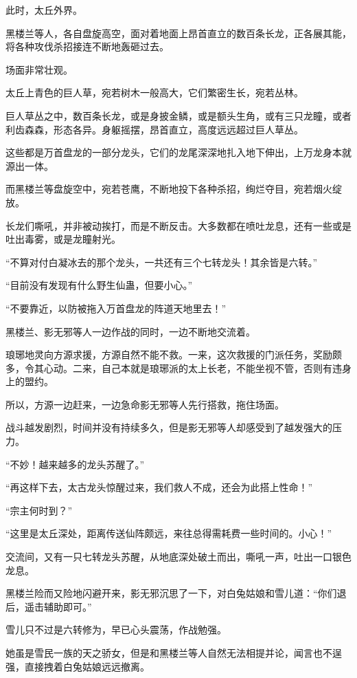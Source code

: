 \begin{this_body}
此时，太丘外界。

黑楼兰等人，各自盘旋高空，面对着地面上昂首直立的数百条长龙，正各展其能，将各种攻伐杀招接连不断地轰砸过去。

场面非常壮观。

太丘上青色的巨人草，宛若树木一般高大，它们繁密生长，宛若丛林。

巨人草丛之中，数百条长龙，或是身披金鳞，或是额头生角，或有三只龙瞳，或者利齿森森，形态各异。身躯摇摆，昂首直立，高度远远超过巨人草丛。

这些都是万首盘龙的一部分龙头，它们的龙尾深深地扎入地下伸出，上万龙身本就源出一体。

而黑楼兰等盘旋空中，宛若苍鹰，不断地投下各种杀招，绚烂夺目，宛若烟火绽放。

长龙们嘶吼，并非被动挨打，而是不断反击。大多数都在喷吐龙息，还有一些或是吐出毒雾，或是龙瞳射光。

“不算对付白凝冰去的那个龙头，一共还有三个七转龙头！其余皆是六转。”

“目前没有发现有什么野生仙蛊，但要小心。”

“不要靠近，以防被拖入万首盘龙的阵道天地里去！”

黑楼兰、影无邪等人一边作战的同时，一边不断地交流着。

琅琊地灵向方源求援，方源自然不能不救。一来，这次救援的门派任务，奖励颇多，令其心动。二来，自己本就是琅琊派的太上长老，不能坐视不管，否则有违身上的盟约。

所以，方源一边赶来，一边急命影无邪等人先行搭救，拖住场面。

战斗越发剧烈，时间并没有持续多久，但是影无邪等人却感受到了越发强大的压力。

“不妙！越来越多的龙头苏醒了。”

“再这样下去，太古龙头惊醒过来，我们救人不成，还会为此搭上性命！”

“宗主何时到？”

“这里是太丘深处，距离传送仙阵颇远，来往总得需耗费一些时间的。小心！”

交流间，又有一只七转龙头苏醒，从地底深处破土而出，嘶吼一声，吐出一口银色龙息。

黑楼兰险而又险地闪避开来，影无邪沉思了一下，对白兔姑娘和雪儿道：“你们退后，遥击辅助即可。”

雪儿只不过是六转修为，早已心头震荡，作战勉强。

她虽是雪民一族的天之骄女，但是和黑楼兰等人自然无法相提并论，闻言也不逞强，直接拽着白兔姑娘远远撤离。


\end{this_body}
